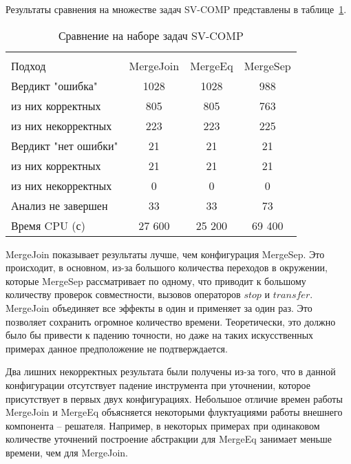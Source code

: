 Результаты сравнения на множестве задач SV-COMP представлены в таблице~\ref{table-sv-comp-merge}.

  \begin{table}[h]\footnotesize \centering
    \caption{Сравнение на наборе задач SV-COMP}
  	\label{table-sv-comp-merge}
    \begin{tabular}{ | l | c | c | c | }
      \hline
      		& 		\multicolumn{3}{c|}{\theory}  \\
      Подход         				& MergeJoin & MergeEq 	& MergeSep   \\ \hline
      Вердикт "ошибка" 				& 1028    	& 1028		& 988         \\ 
  \hspace{0.5cm} из них корректных 	& 805 		& 805 		& 763      \\ 
  \hspace{0.5cm} из них некорректных & 223 		& 223 		& 225        \\ \hline
      Вердикт "нет ошибки"  		& 21      	& 21        & 21       \\ 
  \hspace{0.5cm} из них корректных 	& 21 		& 21    	& 21        \\
  \hspace{0.5cm} из них некорректных & 0 		& 0    		& 0         \\ \hline
      Анализ не завершен       		& 33     	& 33        & 73       \\ \hline
      Время CPU (с)   				& 27 600 	& 25 200    & 69 400    \\ 
      \hline
    \end{tabular}
  \end{table}

MergeJoin показывает результаты лучше, чем конфигурация MergeSep.
Это происходит, в основном, из-за большого количества переходов в окружении, которые MergeSep рассматривает по одному, что приводит к большому количеству проверок совместности, вызовов операторов $stop$ и $transfer$.
MergeJoin объединяет все эффекты в один и применяет за один раз. Это позволяет сохранить огромное количество времени. Теоретически, это должно было бы привести к падению точности, но даже на таких искусственных примерах данное предположение не подтверждается.

Два лишних некорректных результата были получены из-за того, что в данной конфигурации отсутствует падение инструмента при уточнении, которое присутствует в первых двух конфигурациях.
Небольшое отличие времен работы MergeJoin и MergeEq объясняется некоторыми флуктуациями работы внешнего компонента -- решателя. 
Например, в некоторых примерах при одинаковом количестве уточнений построение абстракции для MergeEq занимает меньше времени, чем для MergeJoin.

